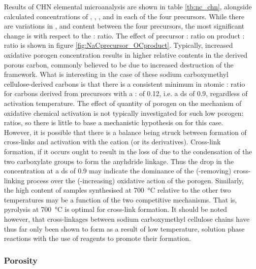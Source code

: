 Results of CHN elemental microanalysis are shown in table \ref{tb:nc_chn}, alongside calculated concentrations of , , , and  in each of the four precursors. While there are variations in ,  and  content between the four precursors, the most significant change is with respect to the : ratio. The effect of precursor : ratio on product : ratio is shown in figure \ref{fig:NaCprecursor_OCproduct}. Typically, increased oxidative \gls{porogen} concentration results in higher relative  contents in the derived porous carbon, commonly believed to be due to increased destruction of the  framework.\citep{park2002effect, chen2020insight, tseng2007physical} What is interesting in the case of these sodium carboxymethyl cellulose-derived carbons is that there is a consistent minimum in atomic : ratio for carbons derived from precursors with a : of 0.12, i.e. a \acrshort{ds} of 0.9, regardless of activation temperature. The effect of quantity of \gls{porogen} on the mechanism of oxidative chemical activation is not typically investigated for such low \gls{porogen}: ratios, so there is little to base a mechanistic hypothesis on for this case. However, it is possible that there is a balance being struck between formation of cross-links and activation with the  cation (or its derivatives). Cross-link formation, if it occurs ought to result in the loss of  due to the condensation of the two carboxylate groups to form the anyhdride linkage. Thus the drop in the  concentration at a \acrshort{ds} of 0.9 may indicate the dominance of the (-removing) cross-linking process over the (-increasing) oxidative action of the \gls{porogen}. Similarly, the high  content of samples synthesised at \qty{700}{\degreeCelsius} relative to the other two temperatures may be a function of the two competitive mechanisms. That is, pyrolysis at \qty{700}{\degreeCelsius} is optimal for cross-link formation. It should be noted however, that cross-linkages between sodium carboxymethyl cellulose chains have thus far only been shown to form as a result of low temperature, solution phase reactions with the use of reagents to promote their formation.\citep{lin2015preparation, yu2017koh, yu2017one}

\subsubsection{Porosity}

